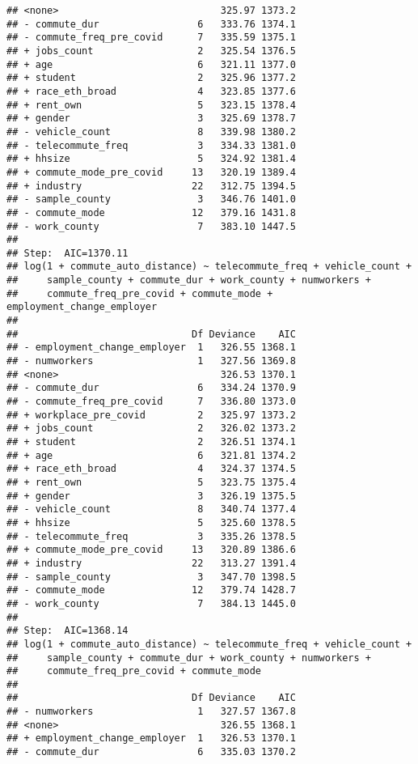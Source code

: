\documentclass[
]{article}
\begin{document}
\begin{verbatim}
## <none>                            325.97 1373.2
## - commute_dur                 6   333.76 1374.1
## - commute_freq_pre_covid      7   335.59 1375.1
## + jobs_count                  2   325.54 1376.5
## + age                         6   321.11 1377.0
## + student                     2   325.96 1377.2
## + race_eth_broad              4   323.85 1377.6
## + rent_own                    5   323.15 1378.4
## + gender                      3   325.69 1378.7
## - vehicle_count               8   339.98 1380.2
## - telecommute_freq            3   334.33 1381.0
## + hhsize                      5   324.92 1381.4
## + commute_mode_pre_covid     13   320.19 1389.4
## + industry                   22   312.75 1394.5
## - sample_county               3   346.76 1401.0
## - commute_mode               12   379.16 1431.8
## - work_county                 7   383.10 1447.5
## 
## Step:  AIC=1370.11
## log(1 + commute_auto_distance) ~ telecommute_freq + vehicle_count + 
##     sample_county + commute_dur + work_county + numworkers + 
##     commute_freq_pre_covid + commute_mode + employment_change_employer
## 
##                              Df Deviance    AIC
## - employment_change_employer  1   326.55 1368.1
## - numworkers                  1   327.56 1369.8
## <none>                            326.53 1370.1
## - commute_dur                 6   334.24 1370.9
## - commute_freq_pre_covid      7   336.80 1373.0
## + workplace_pre_covid         2   325.97 1373.2
## + jobs_count                  2   326.02 1373.2
## + student                     2   326.51 1374.1
## + age                         6   321.81 1374.2
## + race_eth_broad              4   324.37 1374.5
## + rent_own                    5   323.75 1375.4
## + gender                      3   326.19 1375.5
## - vehicle_count               8   340.74 1377.4
## + hhsize                      5   325.60 1378.5
## - telecommute_freq            3   335.26 1378.5
## + commute_mode_pre_covid     13   320.89 1386.6
## + industry                   22   313.27 1391.4
## - sample_county               3   347.70 1398.5
## - commute_mode               12   379.74 1428.7
## - work_county                 7   384.13 1445.0
## 
## Step:  AIC=1368.14
## log(1 + commute_auto_distance) ~ telecommute_freq + vehicle_count + 
##     sample_county + commute_dur + work_county + numworkers + 
##     commute_freq_pre_covid + commute_mode
## 
##                              Df Deviance    AIC
## - numworkers                  1   327.57 1367.8
## <none>                            326.55 1368.1
## + employment_change_employer  1   326.53 1370.1
## - commute_dur                 6   335.03 1370.2

\end{verbatim}
\end{document}
